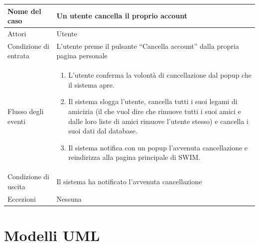 \documentclass[a4paper,12pt]{article}
\begin{document}
\begin{tabularx}{\textwidth}{|l|X|}
\hline Nome del caso & Un utente cancella il proprio account \\
\hline Attori & Utente \\ 
\hline Condizione di entrata & L'utente preme il pulsante “Cancella account” dalla propria pagina personale \\
\hline Flusso degli eventi & 
\begin{enumerate}
\itemsep0em
\item L'utente conferma la volontà di cancellazione dal popup che il sistema apre.
\item Il sistema slogga l'utente, cancella tutti i suoi legami di amicizia (il che vuol dire che rimuove tutti i suoi amici e dalle loro liste di amici rimuove l'utente stesso) e cancella i suoi dati dal database.
\item Il sistema notifica con un popup l'avvenuta cancellazione e reindirizza alla pagina principale di SWIM.
\end{enumerate}
 \\ 
\hline Condizione di uscita & Il sistema ha notificato l'avvenuta cancellazione \\
\hline Eccezioni & Nessuna
\\
\hline 
\end{tabularx}
\clearpage
\section{Modelli UML}
\end{document}
